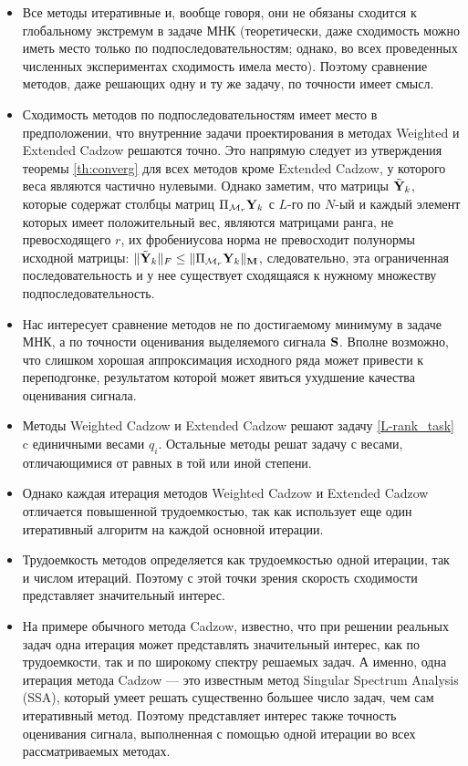 \documentclass[12pt,a4paper,fleqn,leqno]{article}
\begin{document}
\begin{itemize}
\item
Все методы итеративные и, вообще говоря, они не обязаны сходится к глобальному экстремум в задаче МНК  (теоретически, даже сходимость можно иметь место только по подпоследовательностям; однако, во всех проведенных численных экспериментах сходимость имела место). Поэтому сравнение методов, даже
решающих одну и ту же задачу,  по точности имеет смысл.
\item
Сходимость методов по подпоследовательностям имеет место в предположении, что внутренние задачи проектирования в методах Weighted и Extended Cadzow решаются точно. Это напрямую следует из утверждения теоремы \ref{th:converg} для всех методов кроме Extended Cadzow, у которого веса являются частично нулевыми. Однако заметим, что  матрицы $\tilde {\mathbf{Y}}_k$, которые содержат столбцы матриц $\Pi_{\mathcal{M}_r} \mathbf{Y}_k$ с $L$-го по $N$-ый и каждый элемент которых имеет положительный вес, являются матрицами ранга, не превосходящего $r$, их фробениусова норма не превосходит полунормы исходной матрицы: $\|\tilde {\mathbf{Y}}_k\|_F \le \|\Pi_{\mathcal{M}_r} \mathbf{Y}_k\|_{\mathbf{M}}$, следовательно, эта ограниченная последовательность и у нее существует сходящаяся к нужному множеству подпоследовательность.
\item
Нас интересует сравнение методов не по достигаемому минимуму в задаче МНК, а по точности оценивания выделяемого сигнала $\mathbf{S}$.
Вполне возможно, что слишком хорошая аппроксимация исходного ряда может привести к переподгонке, результатом которой
может явиться ухудшение качества оценивания сигнала.
\item
Методы Weighted Cadzow и Extended Cadzow решают задачу \eqref{L-rank_task} c единичными весами $q_i$. Остальные методы решат задачу с весами, отличающимися от равных в той или иной степени.
\item
Однако каждая итерация методов Weighted Cadzow и Extended Cadzow отличается повышенной трудоемкостью, так как использует
еще один итеративный алгоритм на каждой основной итерации.
\item
Трудоемкость методов определяется как трудоемкостью одной итерации, так и числом итераций. Поэтому с этой точки зрения скорость сходимости представляет значительный интерес.
\item
На примере обычного метода Cadzow, известно, что при решении реальных задач одна итерация может представлять значительный интерес, как по трудоемкости, так и по широкому спектру решаемых задач. А именно, одна итерация метода Cadzow --- это известным метод Singular Spectrum Analysis (SSA), который умеет решать существенно большее число задач, чем сам итеративный метод. Поэтому представляет интерес также точность оценивания сигнала, выполненная с помощью одной итерации во всех рассматриваемых методах.

\end{itemize}
\end{document}
